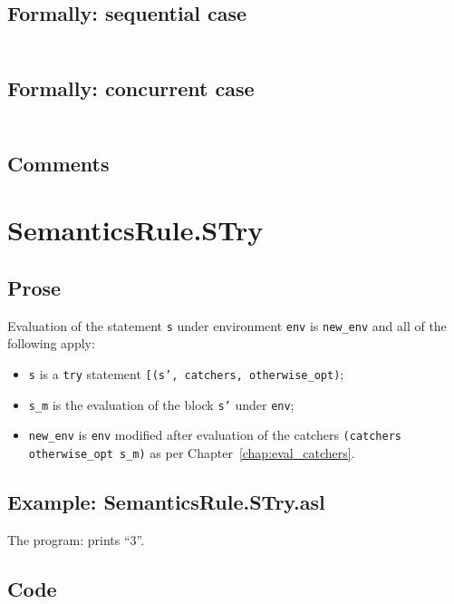 \documentclass{book}
\begin{document}
  \subsection{Formally: sequential case}
  \begin{align}
  \end{align} 

  \subsection{Formally: concurrent case}
  \begin{align}
  \end{align} 

    \subsection{Comments}

\section{SemanticsRule.STry \label{sec:SemanticsRule.STry}}

    \subsection{Prose}
  Evaluation of the statement \texttt{s} under environment \texttt{env} is
\texttt{new\_env} and all of the following apply:
    \begin{itemize}
    \item \texttt{s} is a \texttt{try} statement \texttt{[(s', catchers, otherwise\_opt)};
    \item \texttt{s\_m} is the evaluation of the block \texttt{s'} under \texttt{env};
    \item \texttt{new\_env} is \texttt{env} modified after evaluation of the catchers \texttt{(catchers
      otherwise\_opt s\_m)} as per Chapter~\ref{chap:eval_catchers}.
    \end{itemize}

    \subsection{Example: SemanticsRule.STry.asl}
    The program:
    prints ``3''.

  \subsection{Code}
\end{document}
